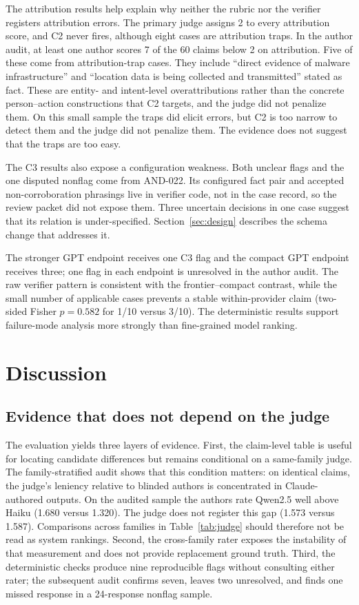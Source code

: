 \documentclass[conference]{IEEEtran}
\newcommand{\checkc}[1]{\textsc{#1}}
\begin{document}
The attribution results help explain why neither the rubric nor the verifier
registers attribution errors. The primary judge assigns 2 to every attribution
score, and \checkc{C2} never fires, although eight cases are attribution traps.
In the author audit, at least one author scores 7 of the 60 claims below 2 on
attribution. Five of these come from attribution-trap cases. They include ``direct evidence of malware
infrastructure'' and ``location data is being collected and transmitted'' stated
as fact. These are entity- and intent-level overattributions rather than the
concrete person--action constructions that \checkc{C2} targets, and the judge
did not penalize them. On this small sample the traps did elicit errors, but
\checkc{C2} is too narrow to detect them and the judge did not penalize them.
The evidence does not suggest that the traps are too easy.

The \checkc{C3} results also expose a configuration weakness. Both unclear flags
and the one disputed nonflag come from AND-022. Its configured fact pair and
accepted non-corroboration phrasings live in verifier code, not in the case
record, so the review packet did not expose them. Three uncertain decisions in
one case suggest that its relation is under-specified.
Section~\ref{sec:design} describes the schema change that addresses it.

The stronger GPT endpoint receives one \checkc{C3} flag and the compact GPT
endpoint receives three; one flag in each endpoint is unresolved in the author
audit. The raw verifier pattern is consistent with the frontier--compact
contrast, while the small number of applicable cases prevents
a stable within-provider claim (two-sided Fisher $p=0.582$ for 1/10 versus
3/10). The deterministic results support failure-mode analysis more strongly
than fine-grained model ranking.

\section{Discussion}
\subsection{Evidence that does not depend on the judge}
The evaluation yields three layers of evidence. First, the claim-level table is
useful for locating candidate differences but remains conditional on a
same-family judge. The family-stratified audit shows that this condition
matters: on identical claims, the judge's leniency relative to blinded authors
is concentrated in Claude-authored outputs. On the audited sample the authors
rate Qwen2.5 well above Haiku (1.680 versus 1.320). The judge does not register
this gap (1.573 versus 1.587). Comparisons across families in Table~\ref{tab:judge} should
therefore not be read as system rankings. Second, the cross-family rater exposes the instability of
that measurement and does not provide replacement ground truth. Third, the
deterministic checks produce nine reproducible flags without consulting either
rater; the subsequent audit confirms seven, leaves two unresolved, and finds
one missed response in a 24-response nonflag sample.
\end{document}
